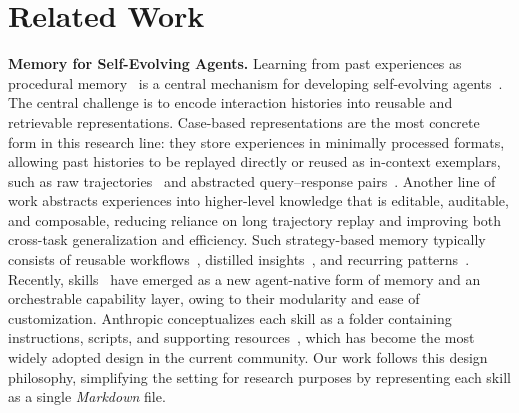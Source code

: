 \section{Related Work}

\noindent\textbf{Memory for Self-Evolving Agents.} 
Learning from past experiences as procedural memory~\citep{wu2025human, wei2025evo, shen2026decocted, hu2025memory, huang2026rethinking, zhang2024working} is a central mechanism for developing self-evolving agents~\citep{gao2025survey, fang2025comprehensive}. 
The central challenge is to encode interaction histories into reusable and retrievable representations.
Case-based representations are the most concrete form in this research line: they store experiences in minimally processed formats, allowing past histories to be replayed directly or reused as in-context exemplars, such as raw trajectories~\citep{zheng2023synapse, DBLP:journals/corr/abs-2508-16153, wu2025comemagent} and abstracted query–response pairs~\citep{zhao2024expel, islam-etal-2024-mapcoder}. Another line of work abstracts experiences into higher-level knowledge that is editable, auditable, and composable, reducing reliance on long trajectory replay and improving both cross-task generalization and efficiency. Such strategy-based memory typically consists of reusable workflows~\citep{wang2025agent, DBLP:journals/corr/abs-2507-06229}, distilled insights~\citep{ouyang2026reasoningbank, huang-etal-2025-r2d2, DBLP:journals/corr/abs-2509-04439}, and recurring patterns~\citep{yang2024buffer, kim-etal-2025-principles}.
Recently, skills~\citep{wang2025inducing, kuroki2025agent, DBLP:journals/corr/abs-2602-08004, DBLP:journals/corr/abs-2602-12670, DBLP:journals/corr/abs-2602-02474, yang2026autoskillexperiencedrivenlifelonglearning, alzubi2026evoskill, liang2026skillnet} have emerged as a new agent-native form of memory and an orchestrable capability layer, owing to their modularity and ease of customization. Anthropic conceptualizes each skill as a folder containing instructions, scripts, and supporting resources~\citep{anthropic_agent_skills_overview}, which has become the most widely adopted design in the current community. Our work follows this design philosophy, simplifying the setting for research purposes by representing each skill as a single \textit{Markdown} file.

